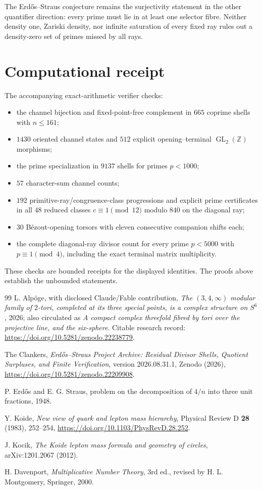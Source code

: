 \documentclass[11pt]{article}
\theoremstyle{definition}
\theoremstyle{remark}
\newcommand{\Z}{\mathbb Z}
\newcommand{\GL}{\operatorname{GL}}
\newcommand{\1}{\mathbf 1}
\begin{document}
The Erdős--Straus conjecture remains the surjectivity statement in the other
quantifier direction: every prime must lie in at least one selector fibre.
Neither density one, Zariski density, nor infinite saturation of every fixed
ray rules out a density-zero set of primes missed by all rays.

\section*{Computational receipt}

The accompanying exact-arithmetic verifier checks:
\begin{itemize}
\item the channel bijection and fixed-point-free complement in $665$ coprime
shells with $n\le161$;
\item $1430$ oriented channel states and $512$ explicit
opening--terminal $\GL_2(\Z)$ morphisms;
\item the prime specialization in $9137$ shells for primes $p<1000$;
\item $57$ character-sum channel counts;
\item $192$ primitive-ray/congruence-class progressions and explicit prime
certificates in all $48$ reduced classes $c\equiv1\pmod{12}$ modulo $840$ on
the diagonal ray;
\item $30$ Bézout-opening torsors with eleven consecutive companion shifts
each;
\item the complete diagonal-ray divisor count for every prime $p<5000$ with
$p\equiv1\pmod4$, including the exact terminal matrix multiplicity.
\end{itemize}
These checks are bounded receipts for the displayed identities.  The proofs
above establish the unbounded statements.

\begin{thebibliography}{99}
L. Alpöge, with disclosed Claude/Fable contribution,
\emph{The $(3,4,\infty)$ modular family of $2$-tori, completed at its three
special points, is a complex structure on $S^6$}, 2026; also circulated as
\emph{A compact complex threefold fibred by tori over the projective line,
and the six-sphere}.  Citable research record:
\url{https://doi.org/10.5281/zenodo.22238779}.

The Clankers,
\emph{Erdős--Straus Project Archive: Residual Divisor Shells, Quotient
Surpluses, and Finite Verification}, version 2026.08.31.1, Zenodo (2026),
\url{https://doi.org/10.5281/zenodo.22209908}.

P. Erdős and E. G. Straus,
problem on the decomposition of $4/n$ into three unit fractions, 1948.

Y. Koide,
\emph{New view of quark and lepton mass hierarchy},
Physical Review D \textbf{28} (1983), 252--254,
\url{https://doi.org/10.1103/PhysRevD.28.252}.

J. Kocik,
\emph{The Koide lepton mass formula and geometry of circles},
arXiv:1201.2067 (2012).

H. Davenport,
\emph{Multiplicative Number Theory}, 3rd ed., revised by H. L. Montgomery,
Springer, 2000.
\end{thebibliography}
\end{document}
